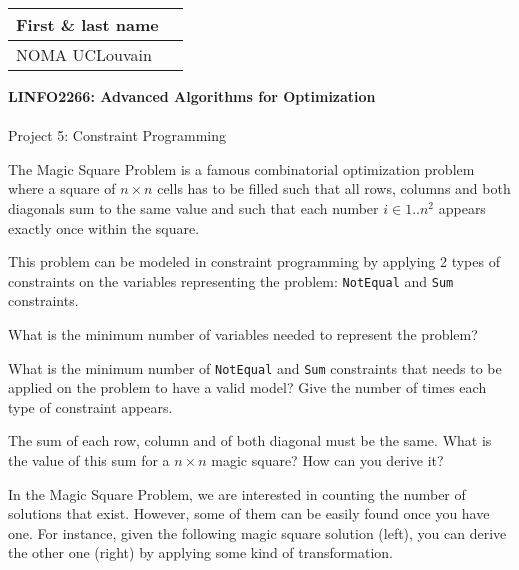 \documentclass[12pt]{report}
\newcommand{\answerbox}[2]{\hfill\break\\
	\framebox[\linewidth]{\parbox[c][#1][c]{\dimexpr\linewidth-2\fboxsep-2\fboxrule}{#2}}
}
\newcounter{row}
\newcounter{col}
\begin{document}
	\hfill
	\begingroup
	\Large
	\begin{tabular}{|l|p{6cm}|}
		\hline
		First \& last name &
		\\ \hline
		NOMA UCLouvain &
		\\ \hline
	\end{tabular}
	\endgroup
	\vspace{1.5cm}

	\noindent
	\begingroup
	\Large
	\textbf{LINFO2266: Advanced Algorithms for Optimization}\\\\
	Project 5: Constraint Programming
	\endgroup
	\vspace{0.2cm}

	\begin{Exercise}[title={Modeling the Magic Square Problem}]

		The Magic Square Problem is a famous combinatorial optimization problem where a square of $n\times n$ cells has to be filled such that all rows, columns and both diagonals sum to the same value and such that each number $i \in 1..n^2$ appears exactly once within the square.

		This problem can be modeled in constraint programming by applying 2 types of constraints on the variables representing the problem: \texttt{NotEqual} and \texttt{Sum} constraints.

		\Question What is the minimum number of variables needed to represent the problem?
		\answerbox{2cm}{
		}

		\Question What is the minimum number of \texttt{NotEqual} and \texttt{Sum} constraints that needs to be applied on the problem to have a valid model? Give the number of times each type of constraint appears.
		\answerbox{3cm}{
		}

		\Question The sum of each row, column and of both diagonal must be the same. What is the value of this sum for a $n\times n$ magic square? How can you derive it?
		\answerbox{4cm}{
		}

		In the Magic Square Problem, we are interested in counting the number of solutions that exist. However, some of them can be easily found once you have one. For instance, given the following magic square solution (left), you can derive the other one (right) by applying some kind of transformation.

\begin{minipage}{0.4\linewidth}
	\centering
\begin{tikzpicture}[scale=0.8]


\end{tikzpicture}
\end{minipage}
\end{Exercise}
\end{document}
